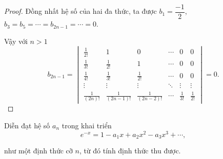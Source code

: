\documentclass[class=linearalgebra,crop=false]{standalone}
\begin{document}
\begin{proof}
    \par Đồng nhất hệ số của hai đa thức, ta được $b_{1} = \dfrac{-1}{2}$, $b_{3} = b_{5} = \cdots = b_{2n-1} = \cdots = 0$.
    \par Vậy với $n > 1$
    \[
        b_{2n-1} =
        \begin{vmatrix}
            \frac{1}{2!}      & 1                 & 0                 & \cdots & 0            & 0                  \\
            \frac{1}{3!}      & \frac{1}{2!}      & 1                 & \cdots & 0            & 0                  \\
            \frac{1}{4!}      & \frac{1}{3!}      & \frac{1}{2!}      & \cdots & 0            & 0                  \\
            \vdots            & \vdots            & \vdots            & \ddots & \vdots       & \vdots             \\
            \frac{1}{(2n)!}   & \frac{1}{(2n-1)!} & \frac{1}{(2n-2)!} & \cdots & \frac{1}{3!} & \frac{1}{2!}
        \end{vmatrix}
        = 0.
    \]
\end{proof}

\begin{exercise}
    \par Diễn đạt hệ số $a_{n}$ trong khai triển
    \[
        e^{-x} = 1 - a_{1}x + a_{2}x^{2} - a_{3}x^{3} + \cdots ,
    \]
    \par như một định thức cỡ $n$, từ đó tính định thức thu được.
\end{exercise}
\end{document}

